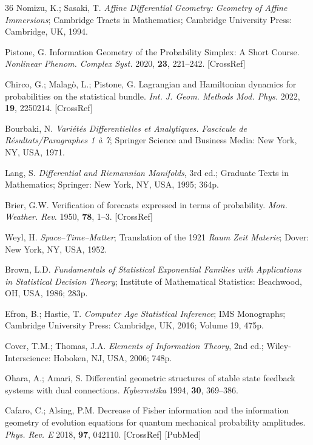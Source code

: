 \documentclass[12pt]{article}
\begin{document}
\begin{thebibliography}{36}
Nomizu, K.; Sasaki, T. \textit{Affine Differential Geometry: Geometry of Affine Immersions};
Cambridge Tracts in Mathematics; Cambridge University Press: Cambridge, UK, 1994.

Pistone, G. Information Geometry of the Probability Simplex: A Short Course.
\textit{Nonlinear Phenom. Complex Syst.} 2020, \textbf{23}, 221--242. [CrossRef]

Chirco, G.; Malag\`o, L.; Pistone, G. Lagrangian and Hamiltonian dynamics for probabilities
on the statistical bundle. \textit{Int. J. Geom. Methods Mod. Phys.} 2022, \textbf{19}, 2250214.
[CrossRef]

Bourbaki, N. \textit{Variétés Differentielles et Analytiques. Fascicule de Résultats/Paragraphes 1 à 7};
Springer Science and Business Media: New York, NY, USA, 1971.

Lang, S. \textit{Differential and Riemannian Manifolds}, 3rd ed.;
Graduate Texts in Mathematics; Springer: New York, NY, USA, 1995; 364p.

Brier, G.W. Verification of forecasts expressed in terms of probability.
\textit{Mon. Weather. Rev.} 1950, \textbf{78}, 1--3. [CrossRef]

Weyl, H. \textit{Space--Time--Matter}; Translation of the 1921 \textit{Raum Zeit Materie};
Dover: New York, NY, USA, 1952.

Brown, L.D. \textit{Fundamentals of Statistical Exponential Families with Applications in Statistical Decision Theory};
Institute of Mathematical Statistics: Beachwood, OH, USA, 1986; 283p.

Efron, B.; Hastie, T. \textit{Computer Age Statistical Inference}; IMS Monographs;
Cambridge University Press: Cambridge, UK, 2016; Volume 19, 475p.

Cover, T.M.; Thomas, J.A. \textit{Elements of Information Theory}, 2nd ed.;
Wiley-Interscience: Hoboken, NJ, USA, 2006; 748p.

Ohara, A.; Amari, S. Differential geometric structures of stable state feedback systems with dual connections.
\textit{Kybernetika} 1994, \textbf{30}, 369--386.

Cafaro, C.; Alsing, P.M. Decrease of Fisher information and the information geometry of evolution equations
for quantum mechanical probability amplitudes. \textit{Phys. Rev. E} 2018, \textbf{97}, 042110.
[CrossRef] [PubMed]


\end{thebibliography}
\end{document}
